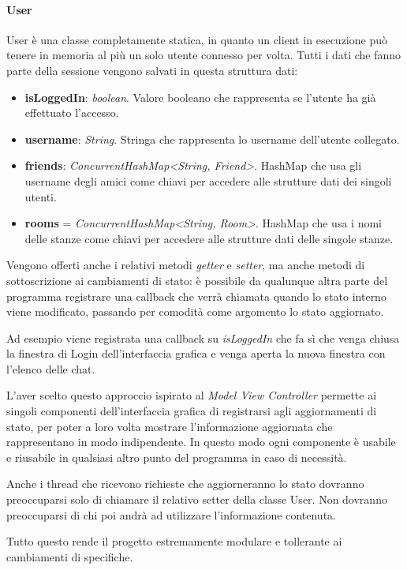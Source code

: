 \paragraph{User}
User è una classe completamente statica, in quanto un client in esecuzione può tenere in memoria al più un solo utente connesso per volta. Tutti i dati che fanno parte della sessione vengono salvati in questa struttura dati:
\begin{itemize}
    \item \textbf{isLoggedIn}: \textit{boolean}. Valore booleano che rappresenta se l'utente ha già effettuato l'accesso.
    \item \textbf{username}: \textit{String}. Stringa che rappresenta lo username dell'utente collegato.
    \item \textbf{friends}: \textit{ConcurrentHashMap<String, Friend>}. HashMap che usa gli username degli amici come chiavi per accedere alle strutture dati dei singoli utenti.
    \item \textbf{rooms} = \textit{ConcurrentHashMap<String, Room>}. HashMap che usa i nomi delle stanze come chiavi per accedere alle strutture dati delle singole stanze.
\end{itemize}

Vengono offerti anche i relativi metodi \textit{getter} e \textit{setter}, ma anche metodi di sottoscrizione ai cambiamenti di stato: è possibile da qualunque altra parte del programma registrare una callback che verrà chiamata quando lo stato interno viene modificato, passando per comodità come argomento lo stato aggiornato.

Ad esempio viene registrata una callback su \textit{isLoggedIn} che fa sì che venga chiusa la finestra di Login dell'interfaccia grafica e venga aperta la nuova finestra con l'elenco delle chat.

\noindent L'aver scelto questo approccio ispirato al \textit{Model View Controller} permette ai singoli componenti dell'interfaccia grafica di registrarsi agli aggiornamenti di stato, per poter a loro volta mostrare l'informazione aggiornata che rappresentano in modo indipendente. In questo modo ogni componente è usabile e riusabile in qualsiasi altro punto del programma in caso di necessità.

Anche i thread che ricevono richieste che aggiorneranno lo stato dovranno preoccuparsi solo di chiamare il relativo setter della classe User. Non dovranno preoccuparsi di chi poi andrà ad utilizzare l'informazione contenuta.

Tutto questo rende il progetto estremamente modulare e tollerante ai cambiamenti di specifiche.

